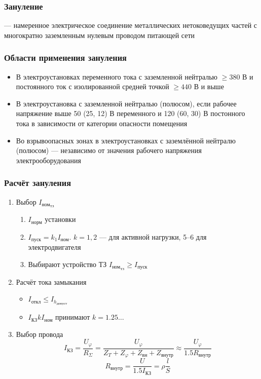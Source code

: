 \documentclass[a4paper, 14pt]{extarticle}
\begin{document}
\FloatBarrier{}
\subsubsection{Зануление}
 --- намеренное электрическое соединение металлических нетоковедущих частей с многократно заземленным нулевым проводом питающей сети 

\subsubsection*{Области применения зануления}
\begin{itemize}
    \item В электроустановках переменного тока с заземленной нейтралью $ \ge 380 $ В и постоянного ток с изолированной средней точкой $ \ge 440 $ В и выше
    \item В электроустановка с заземленной нейтралью (полюсом), если рабочее напряжение выше 50 (25, 12) В переменного и 120 (60, 30) В постонного тока в зависимости от категории опасности помещения
    \item Во взрывоопасных зонах в электроустановках с заземлённой нейтралю (полюсом) --- независимо от значения рабочего напряжения электрооборудования
\end{itemize}

\subsubsection*{Расчёт зануления}
\begin{enumerate}
    \item Выбор $I_{\text{ном}_{\text{ТЗ}}}$
        \begin{enumerate}
            \item $ I_{\text{норм}} $ установки
            \item $ I_{\text{пуск}} = k_1 I_{\text{ном}} $. $k=1,2$ --- для активной нагрузки, 5--6 для электродвигателя
            \item Выбирают устройство ТЗ $ I_{\text{ном}_{\text{ТЗ}}} \ge I_{\text{пуск}} $
        \end{enumerate}
    \item Расчёт тока замыкания
    \begin{itemize}
        \item $ I_{\text{откл}} \le I_{h_{\text{допуст}}} $
        \item $I_{\text{КЗ}} k I_{\text{ном}}$ принимают $k=1.25 \ldots$
    \end{itemize}
    \item Выбор провода
        \[ I_{\text{КЗ}} = \frac{U_\varphi}{R_{ \Sigma }} = \frac{U_\varphi}{ Z_T + Z_\varphi + Z_{\text{вн}} + Z_{\text{внутр}} } \approx \frac{U_\varphi}{1.5 R_{\text{внутр}}}   \] 
        \[ R_{\text{внутр}} = \frac{U}{1.5 I_{\text{КЗ}}} = \rho \frac{l}{S}   \] 
\end{enumerate}
\end{document}
